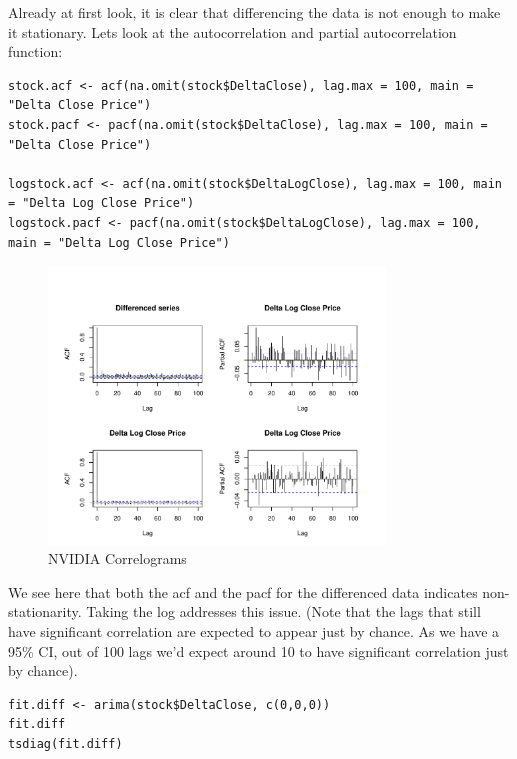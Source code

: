 Already at first look, it is clear that differencing the data is not enough to make it stationary. Lets look at the autocorrelation and partial autocorrelation function:

\begin{lstlisting}
stock.acf <- acf(na.omit(stock$DeltaClose), lag.max = 100, main = "Delta Close Price")
stock.pacf <- pacf(na.omit(stock$DeltaClose), lag.max = 100, main = "Delta Close Price")

logstock.acf <- acf(na.omit(stock$DeltaLogClose), lag.max = 100, main = "Delta Log Close Price")
logstock.pacf <- pacf(na.omit(stock$DeltaLogClose), lag.max = 100, main = "Delta Log Close Price")
\end{lstlisting}

\begin{figure}[H]
\centering
\includegraphics[width=0.8\textwidth]{plots/NVD2.pdf}
\caption{NVIDIA Correlograms}
\end{figure}

We see here that both the acf and the pacf for the differenced data indicates non-stationarity. Taking the log addresses this issue. (Note that the lags that still have significant correlation are expected to appear just by chance. As we have a 95\% CI, out of 100 lags we'd expect around 10 to have significant correlation just by chance). 

\begin{lstlisting}
fit.diff <- arima(stock$DeltaClose, c(0,0,0))
fit.diff
tsdiag(fit.diff)

\end{lstlisting}


